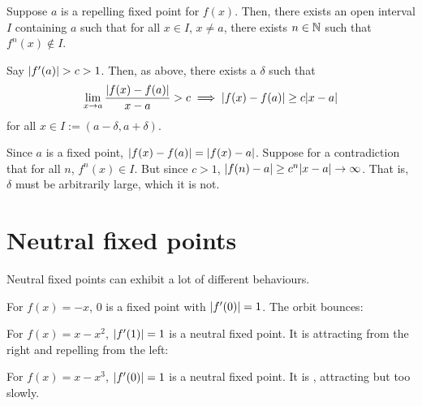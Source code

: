 \documentclass[class=pmath370,tikz,notes]{agony}
\begin{document}
\begin{theorem}
  Suppose $a$ is a repelling fixed point for $f(x)$.
  Then, there exists an open interval $I$ containing $a$
  such that for all $x \in I$, $x \neq a$, there exists $n \in \mathbb{N}$
  such that $f^n(x) \not\in I$.
\end{theorem}
\begin{prf}
  Say $\abs{f'(a)} > c > 1$. Then, as above, there exists a $\delta$ such that
  \[ \lim_{x\to a}\frac{\abs{f(x)-f(a)}}{x-a} > c \implies \abs{f(x)-f(a)} \geq c\abs{x-a} \]
  for all $x \in I := (a-\delta,a+\delta)$.

  Since $a$ is a fixed point, $\abs{f(x) - f(a)} = \abs{f(x) - a}$.
  Suppose for a contradiction that for all $n$, $f^n(x) \in I$.
  But since $c > 1$, $\abs{f(n)-a} \geq c^n\abs{x-a} \to \infty$.
  That is, $\delta$ must be arbitrarily large, which it is not.
\end{prf}

\section{Neutral fixed points}

Neutral fixed points can exhibit a lot of different behaviours.

\begin{example}
  For $f(x) = -x$, 0 is a fixed point with $\abs{f'(0)} = 1$. The orbit bounces:
  \begin{center}
    \quad
  \end{center}
\end{example}

\begin{example}
  For $f(x) = x - x^2$, $\abs{f'(1)} = 1$ is a neutral fixed point.
  It is attracting from the right and repelling from the left:
  \begin{center}
    \quad
  \end{center}
\end{example}

\begin{example}
  For $f(x) = x - x^3$, $\abs{f'(0)} = 1$ is a neutral fixed point.
  It is ,
  attracting but too slowly.
  \begin{center}
    \quad
  \end{center}
\end{example}
\end{document}
